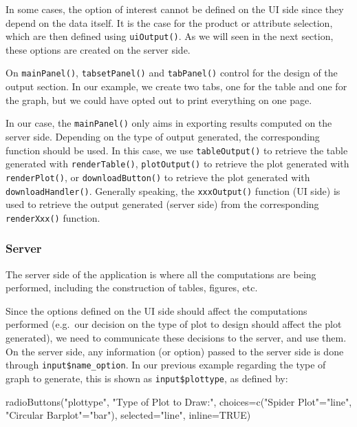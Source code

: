 \documentclass[
]{book}
\newenvironment{Shaded}{\begin{snugshade}}{\end{snugshade}}
\newcommand{\AttributeTok}[1]{\textcolor[rgb]{0.77,0.63,0.00}{#1}}
\newcommand{\ConstantTok}[1]{\textcolor[rgb]{0.00,0.00,0.00}{#1}}
\newcommand{\FunctionTok}[1]{\textcolor[rgb]{0.00,0.00,0.00}{#1}}
\newcommand{\NormalTok}[1]{#1}
\newcommand{\OtherTok}[1]{\textcolor[rgb]{0.56,0.35,0.01}{#1}}
\newcommand{\StringTok}[1]{\textcolor[rgb]{0.31,0.60,0.02}{#1}}
\begin{document}
In some cases, the option of interest cannot be defined on the UI side since they depend on the data itself. It is the case for the product or attribute selection, which are then defined using \texttt{uiOutput()}. As we will seen in the next section, these options are created on the server side.

On \texttt{mainPanel()}, \texttt{tabsetPanel()} and \texttt{tabPanel()} control for the design of the output section. In our example, we create two tabs, one for the table and one for the graph, but we could have opted out to print everything on one page.

In our case, the \texttt{mainPanel()} only aims in exporting results computed on the server side. Depending on the type of output generated, the corresponding function should be used. In this case, we use \texttt{tableOutput()} to retrieve the table generated with \texttt{renderTable()}, \texttt{plotOutput()} to retrieve the plot generated with \texttt{renderPlot()}, or \texttt{downloadButton()} to retrieve the plot generated with \texttt{downloadHandler()}. Generally speaking, the \texttt{xxxOutput()} function (UI side) is used to retrieve the output generated (server side) from the corresponding \texttt{renderXxx()} function.

\hypertarget{server}{%
\subsubsection{Server}\label{server}}

The server side of the application is where all the computations are being performed, including the construction of tables, figures, etc.

Since the options defined on the UI side should affect the computations performed (e.g.~our decision on the type of plot to design should affect the plot generated), we need to communicate these decisions to the server, and use them.
On the server side, any information (or option) passed to the server side is done through \texttt{input\$name\_option}. In our previous example regarding the type of graph to generate, this is shown as \texttt{input\$plottype}, as defined by:

\begin{Shaded}
\begin{Highlighting}[]
\FunctionTok{radioButtons}\NormalTok{(}\StringTok{"plottype"}\NormalTok{, }\StringTok{"Type of Plot to Draw:"}\NormalTok{, }
             \AttributeTok{choices=}\FunctionTok{c}\NormalTok{(}\StringTok{"Spider Plot"}\OtherTok{=}\StringTok{"line"}\NormalTok{, }\StringTok{"Circular Barplot"}\OtherTok{=}\StringTok{"bar"}\NormalTok{), }
             \AttributeTok{selected=}\StringTok{"line"}\NormalTok{, }\AttributeTok{inline=}\ConstantTok{TRUE}\NormalTok{)}
\end{Highlighting}
\end{Shaded}
\end{document}
